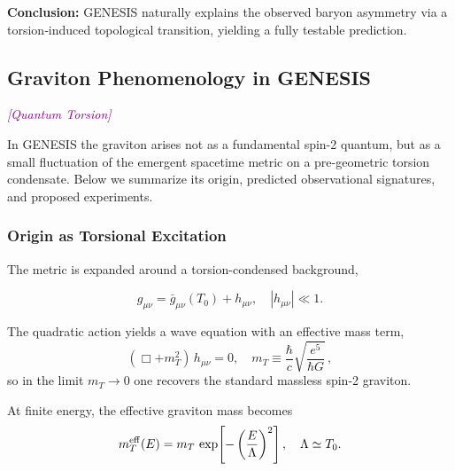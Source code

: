 \documentclass{article}
\newcommand{\quantumtag}{\textcolor{purple}{\textit{[Quantum Torsion]}}}
\begin{document}
\noindent\textbf{Conclusion:}  
GENESIS naturally explains the observed baryon asymmetry via a
torsion‐induced topological transition, yielding a fully testable prediction.

\medskip
\begin{center}
\end{center}
\medskip



\subsection{Graviton Phenomenology in GENESIS}
\label{subsec:graviton_phenomenology}
\quantumtag

In GENESIS the graviton arises not as a fundamental spin-2 quantum, but as
a small fluctuation of the emergent spacetime metric on a pre-geometric torsion
condensate.  Below we summarize its origin, predicted observational signatures,
and proposed experiments.

\subsubsection{ Origin as Torsional Excitation}
The metric is expanded around a torsion-condensed background,

\begin{equation}
  g_{\mu\nu} = \bar g_{\mu\nu}(T_0) + h_{\mu\nu},
  \quad |h_{\mu\nu}|\ll1.
\end{equation}

The quadratic action yields a wave equation with an effective mass term,
\begin{equation}\label{eq:auto171}
(\Box + m_T^2)\,h_{\mu\nu} = 0,
  \quad m_T \equiv \frac{\hbar}{c}\sqrt{\frac{e^5}{\hbar G}}\,,
\end{equation}
so in the limit \(m_T\to0\) one recovers the standard massless spin-2 graviton.

At finite energy, the effective graviton mass becomes
\begin{equation}\label{eq:auto172}
m_T^{\rm eff}(E)
  = m_T\,\exp\!\left[-\left(\frac{E}{\Lambda}\right)^2\right],
  \quad \Lambda \simeq T_0.
\end{equation}
\end{document}
